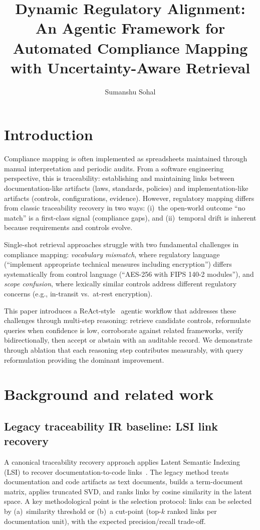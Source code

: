 \documentclass{sn-jnl}
\title[Dynamic Regulatory Alignment]{Dynamic Regulatory Alignment: An Agentic Framework for Automated Compliance Mapping with Uncertainty-Aware Retrieval}
\author*[1]{Sumanshu Sohal}
\affil[1]{Cybersecurity Specialist, Washington, DC, USA}
\begin{document}
\maketitle

\section{Introduction}
Compliance mapping is often implemented as spreadsheets maintained through manual interpretation and periodic audits.
From a software engineering perspective, this is traceability: establishing and maintaining links between documentation-like artifacts (laws, standards, policies) and implementation-like artifacts (controls, configurations, evidence).
However, regulatory mapping differs from classic traceability recovery in two ways: (i)~the open-world outcome ``no match'' is a first-class signal (compliance gaps), and (ii)~temporal drift is inherent because requirements and controls evolve.

Single-shot retrieval approaches struggle with two fundamental challenges in compliance mapping:
\emph{vocabulary mismatch}, where regulatory language (``implement appropriate technical measures including encryption'') differs systematically from control language (``AES-256 with FIPS 140-2 modules''), and
\emph{scope confusion}, where lexically similar controls address different regulatory concerns (e.g., in-transit vs.\ at-rest encryption).

This paper introduces a ReAct-style~\cite{ReAct} agentic workflow that addresses these challenges through multi-step reasoning: retrieve candidate controls, reformulate queries when confidence is low, corroborate against related frameworks, verify bidirectionally, then accept or abstain with an auditable record.
We demonstrate through ablation that each reasoning step contributes measurably, with query reformulation providing the dominant improvement.

\section{Background and related work}

\subsection{Legacy traceability IR baseline: LSI link recovery}
A canonical traceability recovery approach applies Latent Semantic Indexing (LSI) to recover documentation-to-code links~\cite{MarcusMaletic2003}.
The legacy method treats documentation and code artifacts as text documents, builds a term-document matrix, applies truncated SVD, and ranks links by cosine similarity in the latent space.
A key methodological point is the selection protocol: links can be selected by (a)~similarity threshold or (b)~a cut-point (top-$k$ ranked links per documentation unit), with the expected precision/recall trade-off.
\end{document}
